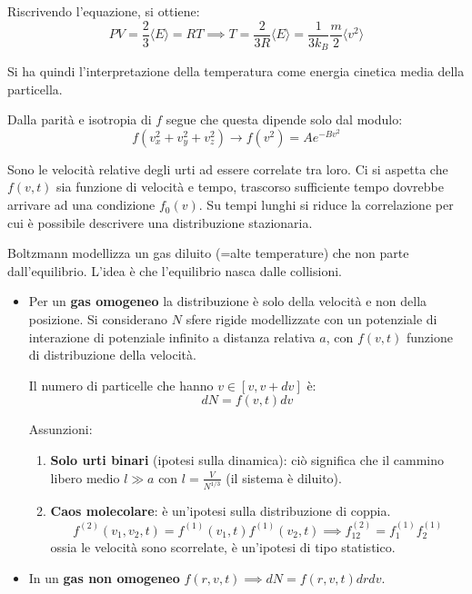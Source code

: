 Riscrivendo l'equazione, si ottiene:
\begin{equation}
    PV = \frac{2}{3} \langle E \rangle = RT \implies T = \frac{2}{3R} \langle E \rangle = \frac{1}{3k_B} \frac{m}{2} \langle v^2 \rangle
    \label{eq:temperature_kinetic}
\end{equation}

Si ha quindi l'interpretazione della temperatura come energia cinetica media della particella.

Dalla parità e isotropia di $f$ segue che questa dipende solo dal modulo:
\begin{equation}
    f(v_x^2 + v_y^2 + v_z^2) \to f(v^2) = A e^{-B v^2}
    \label{eq:distrib_maxwell}
\end{equation}

Sono le velocità relative degli urti ad essere correlate tra loro. Ci si aspetta che $f(v, t)$ sia funzione di velocità e tempo, trascorso sufficiente tempo dovrebbe arrivare ad una condizione $f_0(v)$. Su tempi lunghi si riduce la correlazione per cui è possibile descrivere una distribuzione stazionaria.

Boltzmann modellizza un gas diluito (=alte temperature) che non parte dall'equilibrio. L'idea è che l'equilibrio nasca dalle collisioni.

\begin{itemize}
    \item Per un \textbf{gas omogeneo} la distribuzione è solo della velocità e non della posizione. Si considerano $N$ sfere rigide modellizzate con un potenziale di interazione di potenziale infinito a distanza relativa $a$, con $f(v, t)$ funzione di distribuzione della velocità.
    
    Il numero di particelle che hanno  $v \in [v, v+dv]$ è:
    \begin{equation}
        dN = f(v, t) dv 
        \label{eq:dN_v}
    \end{equation}
    
    Assunzioni:
    \begin{enumerate}
        \item \textbf{Solo urti binari} (ipotesi sulla dinamica): ciò significa che il cammino libero medio $l \gg a$ con $l = \frac{V}{N^{1/3}}$ (il sistema è diluito).
        \item \textbf{Caos molecolare}: è un'ipotesi sulla distribuzione di coppia.
        \begin{equation}
            f^{(2)}(v_1, v_2, t) = f^{(1)}(v_1, t) f^{(1)}(v_2, t) \implies f_{12}^{(2)} = f_1^{(1)} f_2^{(1)}
            \label{eq:caos_molecolare}
        \end{equation}
        ossia le velocità sono scorrelate, è un'ipotesi di tipo statistico.
    \end{enumerate}
    
    \item In un \textbf{gas non omogeneo} $f(r, v, t) \implies dN = f(r, v, t) dr dv$.
\end{itemize}

